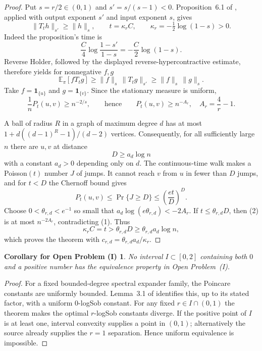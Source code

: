 \documentclass[11pt]{article}
\newtheorem*{corollary}{Corollary for Open Problem (I)}
\newcommand{\E}{\mathbb E}
\newcommand{\piu}{\pi}
\begin{document}
\begin{proof}
Put $s=r/2\in(0,1)$ and $s'=s/(s-1)<0$.  Proposition~6.1 of
\cite{MOS}, applied with output exponent $s'$ and input exponent $s$, gives
\[
       \|T_t h\|_{s'}\ge \|h\|_s,
       \qquad t=\kappa_r C,
       \qquad \kappa_r=-\tfrac12\log(1-s)>0.
\]
Indeed the proposition's time is
\[
 \frac C4\log\frac{1-s'}{1-s}
 =-\frac C2\log(1-s).
\]
Reverse Holder, followed by the displayed reverse-hypercontractive estimate,
therefore yields for nonnegative $f,g$
\[
             \E_{\piu}[fT_tg]
       \ge \|f\|_s\,\|T_tg\|_{s'}
       \ge \|f\|_s\,\|g\|_s.
\]
Take $f=\mathbf1_{\{u\}}$ and $g=\mathbf1_{\{v\}}$.  Since the stationary
measure is uniform,
\[
 \frac1n P_t(u,v)\ge n^{-2/s},
 \qquad\text{hence}\qquad
 P_t(u,v)\ge n^{-A_r},\quad A_r=\frac4r-1.
 \tag{1}
\]

A ball of radius $R$ in a graph of maximum degree $d$ has at most
$1+d((d-1)^R-1)/(d-2)$ vertices.  Consequently, for all sufficiently large
$n$ there are $u,v$ at distance
\[
                         D\ge a_d\log n
\]
with a constant $a_d>0$ depending only on $d$.  The continuous-time walk
makes a Poisson$(t)$ number $J$ of jumps.  It cannot reach $v$ from $u$ in
fewer than $D$ jumps, and for $t<D$ the Chernoff bound gives
\[
             P_t(u,v)\le \Pr\{J\ge D\}
                    \le \left(\frac{et}{D}\right)^D.       \tag{2}
\]
Choose $0<\theta_{r,d}<e^{-1}$ so small that
$a_d\log(e\theta_{r,d})<-2A_r$.  If $t\le\theta_{r,d}D$,
then (2) is at most $n^{-2A_r}$, contradicting (1).  Thus
\[
 \kappa_r C=t>\theta_{r,d}D
   \ge \theta_{r,d}a_d\log n,
\]
which proves the theorem with
$c_{r,d}=\theta_{r,d}a_d/\kappa_r$.
\end{proof}

\begin{corollary}
No interval $I\subset[0,2]$ containing both $0$ and a positive number has
the equivalence property in Open Problem~(I).
\end{corollary}

\begin{proof}
For a fixed bounded-degree spectral expander family, the Poincare constants
are uniformly bounded.  Lemma~3.1 of \cite{MOS} identifies this, up to its
stated factor, with a uniform $0$-logSob constant.  For any fixed
$r\in I\cap(0,1)$ the theorem makes the optimal $r$-logSob constants diverge.
If the positive point of $I$ is at least one, interval convexity supplies a
point in $(0,1)$; alternatively the source already supplies the $r=1$
separation.  Hence uniform equivalence is impossible.
\end{proof}
\end{document}
